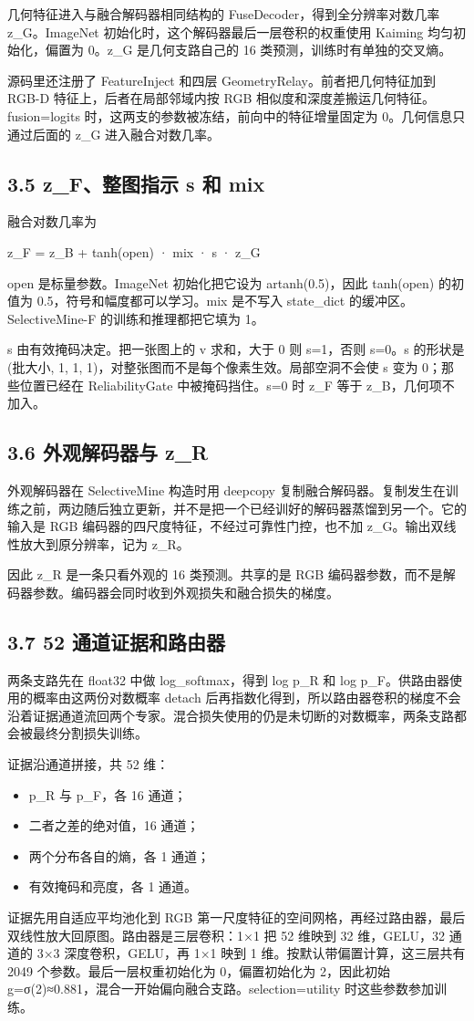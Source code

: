 \documentclass[UTF8,a4paper,11pt]{ctexart}
\begin{document}
几何特征进入与融合解码器相同结构的 FuseDecoder，得到全分辨率对数几率 z\_G。ImageNet 初始化时，这个解码器最后一层卷积的权重使用 Kaiming 均匀初始化，偏置为 0。z\_G 是几何支路自己的 16 类预测，训练时有单独的交叉熵。

源码里还注册了 FeatureInject 和四层 GeometryRelay。前者把几何特征加到 RGB-D 特征上，后者在局部邻域内按 RGB 相似度和深度差搬运几何特征。fusion=logits 时，这两支的参数被冻结，前向中的特征增量固定为 0。几何信息只通过后面的 z\_G 进入融合对数几率。

\subsection*{3.5 z\_F、整图指示 s 和 mix}
融合对数几率为

z\_F = z\_B + tanh(open) · mix · s · z\_G

open 是标量参数。ImageNet 初始化把它设为 artanh(0.5)，因此 tanh(open) 的初值为 0.5，符号和幅度都可以学习。mix 是不写入 state\_dict 的缓冲区。SelectiveMine-F 的训练和推理都把它填为 1。

s 由有效掩码决定。把一张图上的 v 求和，大于 0 则 s=1，否则 s=0。s 的形状是 (批大小, 1, 1, 1)，对整张图而不是每个像素生效。局部空洞不会使 s 变为 0；那些位置已经在 ReliabilityGate 中被掩码挡住。s=0 时 z\_F 等于 z\_B，几何项不加入。

\subsection*{3.6 外观解码器与 z\_R}
外观解码器在 SelectiveMine 构造时用 deepcopy 复制融合解码器。复制发生在训练之前，两边随后独立更新，并不是把一个已经训好的解码器蒸馏到另一个。它的输入是 RGB 编码器的四尺度特征，不经过可靠性门控，也不加 z\_G。输出双线性放大到原分辨率，记为 z\_R。

因此 z\_R 是一条只看外观的 16 类预测。共享的是 RGB 编码器参数，而不是解码器参数。编码器会同时收到外观损失和融合损失的梯度。

\subsection*{3.7 52 通道证据和路由器}
两条支路先在 float32 中做 log\_softmax，得到 log p\_R 和 log p\_F。供路由器使用的概率由这两份对数概率 detach 后再指数化得到，所以路由器卷积的梯度不会沿着证据通道流回两个专家。混合损失使用的仍是未切断的对数概率，两条支路都会被最终分割损失训练。

证据沿通道拼接，共 52 维：

\begin{itemize}
\item p\_R 与 p\_F，各 16 通道；
\item 二者之差的绝对值，16 通道；
\item 两个分布各自的熵，各 1 通道；
\item 有效掩码和亮度，各 1 通道。
\end{itemize}
证据先用自适应平均池化到 RGB 第一尺度特征的空间网格，再经过路由器，最后双线性放大回原图。路由器是三层卷积：1×1 把 52 维映到 32 维，GELU，32 通道的 3×3 深度卷积，GELU，再 1×1 映到 1 维。按默认带偏置计算，这三层共有 2049 个参数。最后一层权重初始化为 0，偏置初始化为 2，因此初始 g=σ(2)≈0.881，混合一开始偏向融合支路。selection=utility 时这些参数参加训练。
\end{document}
